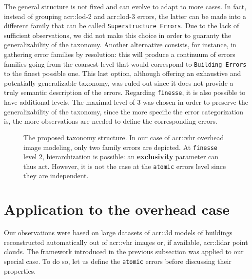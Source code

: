         The general structure is not fixed and can evolve to adapt to more cases.
        In fact, instead of grouping \gls{acr::lod}-2 and \gls{acr::lod}-3 errors, the latter can be made into a different family that can be called \texttt{Superstructure Errors}.
        Due to the lack of sufficient observations, we did not make this choice in order to guaranty the generalizability of the taxonomy.
        Another alternative consists, for instance, in gathering error families by resolution: this will produce a continuum of errors families going from the coarsest level that would correspond to \texttt{Building Errors} to the finest possible one.
        This last option, although offering an exhaustive and potentially generalizable taxonomy, was ruled out since it does not provide a truly semantic description of the errors.
        Regarding \texttt{finesse}, it is also possible to have additional levels.
        The maximal level of 3 was chosen in order to preserve the generalizability of the taxonomy, since the more specific the error categorization is, the more observations are needed to define the corresponding errors.

        \begin{figure}[htb]
            \begin{center}
                
                \caption[
                    The proposed taxonomy structure.
                ]{
                    \label{fig::taxonomy} 
                    The proposed taxonomy structure.
                    In our case of \gls{acr::vhr} overhead image modeling, only two family errors are depicted.
                    At \texttt{finesse} level 2, hierarchization is possible: an \textbf{exclusivity} parameter can thus act.
                    However, it is not the case at the \texttt{atomic} errors level since they are independent.
                }
            \end{center}
        \end{figure}

\section{Application to the overhead case}
    \label{sec::semantic_evaluation::overhead}
    Our observations were based on large datasets of \gls{acr::3d} models of buildings reconstructed automatically out of \gls{acr::vhr} images or, if available, \gls{acr::lidar} point clouds.
    The framework introduced in the previous subsection was applied to our special case.
    To do so, let us define the \texttt{atomic} errors before discussing their properties.

